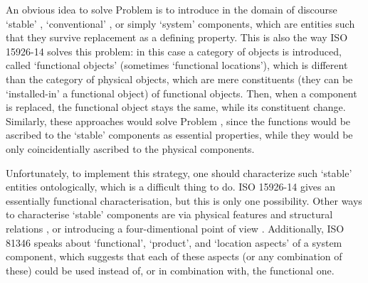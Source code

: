 \documentclass[
]{ceurart}
\begin{document}
An obvious idea to solve Problem  is to introduce in the domain of discourse `stable' \cite{compagnoComparingOntologicalAlternatives2021}, `conventional' \cite{guarinoArtefactualSystemsMissing2014}, or simply `system' \cite{westDevelopingHighQuality2011} components, which are entities such that they survive replacement as a defining property.   
This is also the way ISO 15926-14 \cite{kluwerISO159261420202020} solves this problem: in this case a category of objects is introduced, called `functional objects' (sometimes `functional locations'), which is different than the category of physical objects, which are mere constituents (they can be `installed-in' a functional object) of functional objects. Then, when a component is replaced, the functional object stays the same, while its constituent change. Similarly, these approaches would solve Problem , since the functions would be ascribed to the `stable' components as essential properties, while they would be only coincidentially ascribed to the physical components. 

Unfortunately, to implement this strategy, one should characterize such `stable' entities ontologically, which is a difficult thing to do.
ISO 15926-14 gives an essentially functional characterisation, but this is only one possibility. Other ways to characterise `stable' components are via physical features and structural relations \cite{compagnoComparingOntologicalAlternatives2021}, %
or introducing a four-dimentional point of view \cite{westDevelopingHighQuality2011}. Additionally, ISO 81346 \cite{ISOIEC8134612009} speaks about `functional', `product', and `location aspects' of a system component, which suggests that each of these aspects (or any combination of these) could be used instead of, or in combination with, the functional one.
\end{document}
